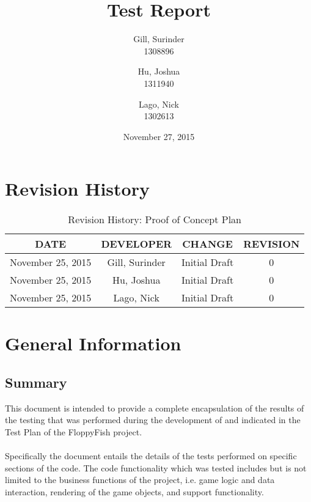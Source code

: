 \documentclass[11pt, oneside]{article}   	%
\title{Test Report}
\author{Gill, Surinder\\
		1308896
		\and
		Hu, Joshua\\
		1311940
		\and
		Lago, Nick\\
		1302613}
\date{November 27, 2015}							%
\begin{document}
\maketitle
\newpage
\tableofcontents
\listoffigures
\listoftables

\newpage
\section{Revision History}
\begin{table}[H]
\caption{Revision History: Proof of Concept Plan}
\begin{center}
\label{tab:}
\begin{tabular}{|c|c|c|c|}
\hline
\textbf{DATE} & \textbf{DEVELOPER} & \textbf{CHANGE} & \textbf{REVISION}\\
\hline
November 25, 2015 & Gill, Surinder & Initial Draft & 0\\
\hline
November 25, 2015 & Hu, Joshua & Initial Draft & 0\\
\hline
November 25, 2015 & Lago, Nick & Initial Draft & 0\\
\hline
\end{tabular}
\end{center}
\label{default}
\end{table}

\newpage
\section{General Information}
\subsection{Summary}
This document is intended to provide a complete encapsulation of the results of the testing that was performed during the development of and indicated in the Test Plan of the FloppyFish project.\\
\\
Specifically the document entails the details of the tests performed on specific sections of the code. The code functionality which was tested includes but is not limited to the business functions of the project, i.e. game logic and data interaction, rendering of the game objects, and support functionality.
\end{document}
